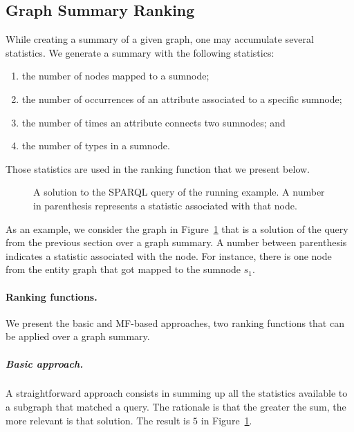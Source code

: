 \subsection{Graph Summary Ranking}
\label{sec:graph-summary-ranking}

While creating a summary of a given graph, one may accumulate several statistics. We generate a summary with the following statistics:
\begin{enumerate}
	\item the number of nodes mapped to a sumnode;
	\item the number of occurrences of an attribute associated to a specific sumnode;
	\item the number of times an attribute connects two sumnodes; and
	\item the number of types in a sumnode.
\end{enumerate}
Those statistics are used in the ranking function that we present below.

\begin{figure}
	\centering
	\resizebox{.6\textwidth}{!}{
		
	}
	\caption{A solution to the SPARQL query of the running example. A number in parenthesis represents a statistic associated with that node.}
	\label{fig:sparql-solution}
\end{figure}

As an example, we consider the graph in Figure~\ref{fig:sparql-solution} that is a solution of the query from the previous section over a graph summary. A number between parenthesis indicates a statistic associated with the node. For instance, there is one node from the entity graph that got mapped to the sumnode $s_1$.

\paragraph{Ranking functions.}

We present the basic and \gls{MF}-based approaches, two ranking functions that can be applied over a graph summary.

\subparagraph{Basic approach.}

A straightforward approach consists in summing up all the statistics available to a subgraph that matched a query. The rationale is that the greater the sum, the more relevant is that solution. The result is $5$ in Figure~\ref{fig:sparql-solution}.


